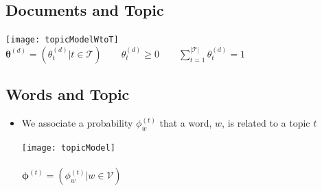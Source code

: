 
\begin{slide}
\section[-2]{Documents and Topic}
\begin{center}
  \texttt{[image: topicModelWtoT]}\pause\\
  $\bm{\theta}^{(d)} = (\theta^{(d)}_t | t \in \mathcal{T}) \qquad
  \theta^{(d)}_t \geq 0 \qquad \sum\limits_{t=1}^{|\mathcal{T}|}
    \theta^{(d)}_t =1$
\end{center}
\end{slide}


\begin{slide}
\section{Words and Topic}

\begin{PauseHighLight}
  \begin{itemize}
  \item We associate a probability $\phi^{(t)}_w$ that a word, $w$, is
    related to a topic $t$\pause
    \begin{center}
      \texttt{[image: topicModel]}\\\ \\
      $\bm{\phi}^{(t)} = (\phi^{(t)}_w | w \in \mathcal{V})$\pause
    \end{center}
  \end{itemize}
\end{PauseHighLight}

\end{slide}


